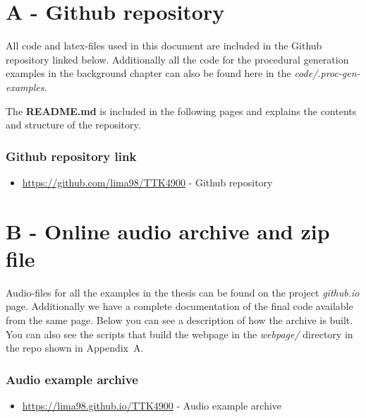 \chapter*{A - Github repository}\label{chap:github}

All code and latex-files used in this document are included in the Github repository linked below. Additionally all the code for the procedural generation examples in the background chapter can also be found here in the \textit{code/.proc-gen-examples}.

The \textbf{README.md} is included in the following pages and explains the contents and structure of the repository.

\subsection*{Github repository link}
\begin{itemize}
    \item \url{https://github.com/lima98/TTK4900} - Github repository
\end{itemize}






\chapter*{B - Online audio archive and zip file}\label{chap:audio-examples}

\renewcommand{\thefigure}{B.\arabic{figure}}
\setcounter{figure}{0}
\renewcommand{\thetable}{B.\arabic{table}}
\setcounter{table}{0}

Audio-files for all the examples in the thesis can be found on the project \textit{github.io} page. Additionally we have a complete documentation of the final code available from the same page. Below you can see a description of how the archive is built. You can also see the scripts that build the webpage in the \textit{webpage/} directory in the repo shown in Appendix~A.

\subsection*{Audio example archive}
\begin{itemize}
    \item \url{https://lima98.github.io/TTK4900} - Audio example archive
\end{itemize}


